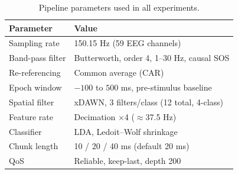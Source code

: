 \begin{table}[t]
\centering
\caption{Pipeline parameters used in all experiments.}
\label{tab:params}
\footnotesize
\begin{tabular}{ll}
\toprule
Parameter & Value \\
\midrule
Sampling rate & 150.15 Hz (59 EEG channels) \\
Band-pass filter & Butterworth, order 4, 1--30 Hz, causal SOS \\
Re-referencing & Common average (CAR) \\
Epoch window & $-100$ to $500$ ms, pre-stimulus baseline \\
Spatial filter & xDAWN, 3 filters/class (12 total, 4-class) \\
Feature rate & Decimation $\times$4 ($\approx$37.5 Hz) \\
Classifier & LDA, Ledoit--Wolf shrinkage \\
Chunk length & 10 / 20 / 40 ms (default 20 ms) \\
QoS & Reliable, keep-last, depth 200 \\
\bottomrule
\end{tabular}
\end{table}
